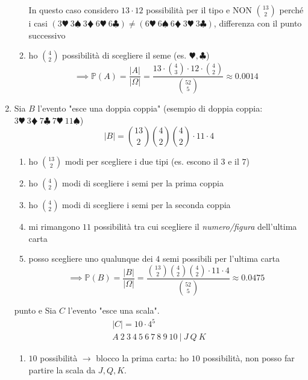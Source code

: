 \begin{enumerate}
\begin{enumerate}
\begin{oss}
In questo caso considero $13\cdot 12$ possibilità per il tipo e NON $\binom{13}{2}$ perché i casi $( 3\varheartsuit \ 3\spadesuit \ 3\vardiamondsuit \ 6\varheartsuit \ 6\clubsuit ) \neq ( 6\varheartsuit \ 6\spadesuit \ 6\vardiamondsuit \ 3\varheartsuit \ 3\clubsuit )$, differenza con il punto successivo
\end{oss}
\item ho $\binom{4}{2}$ possibilità di scegliere il seme (es. $\varheartsuit ,\clubsuit $)\begin{equation*}
\implies \mathbb{P}( A) =\frac{| A| }{| \Omega | } =\frac{13\cdot \binom{4}{3} \cdot 12\cdot \binom{4}{2}}{\binom{52}{5}} \approx 0.0014
\end{equation*}
\end{enumerate}
\item Sia $B$ l'evento "esce una doppia coppia" (esempio di doppia coppia: $3\varheartsuit \ 3\vardiamondsuit \ 7\clubsuit \ 7\varheartsuit \ 11\spadesuit $)\begin{equation*}
| B| =\binom{13}{2}\binom{4}{2}\binom{4}{2} \cdot 11\cdot 4
\end{equation*}
\begin{enumerate}
\item ho $\binom{13}{2}$ modi per scegliere i due tipi (es. escono il $3$ e il $7$)
\item ho $\binom{4}{2}$ modi di scegliere i semi per la prima coppia
\item ho $\binom{4}{2}$ modi di scegliere i semi per la seconda coppia
\item mi rimangono $11$ possibilità tra cui scegliere il \textit{numero/figura} dell'ultima carta
\item posso scegliere uno qualunque dei $4$ semi possibili per l'ultima carta\begin{equation*}
\implies \mathbb{P}( B) =\frac{| B| }{| \Omega | } =\frac{\binom{13}{2}\binom{4}{2}\binom{4}{2} \cdot 11\cdot 4}{\binom{52}{5}} \approx 0.0475
\end{equation*}
\end{enumerate}
\item [punto e] Sia $C$ l'evento "esce una scala".\begin{gather*}
| C| =10\cdot 4^{5}\\
A\ 2\ 3\ 4\ 5\ 6\ 7\ 8\ 9\ 10\ |\ J\ Q\ K
\end{gather*}
\begin{enumerate}
\item $10$ possibilità $\rightarrow $ blocco la prima carta: ho $10$ possibilità, non posso far partire la scala da $J,Q,K$.

\end{enumerate}
\end{enumerate}
